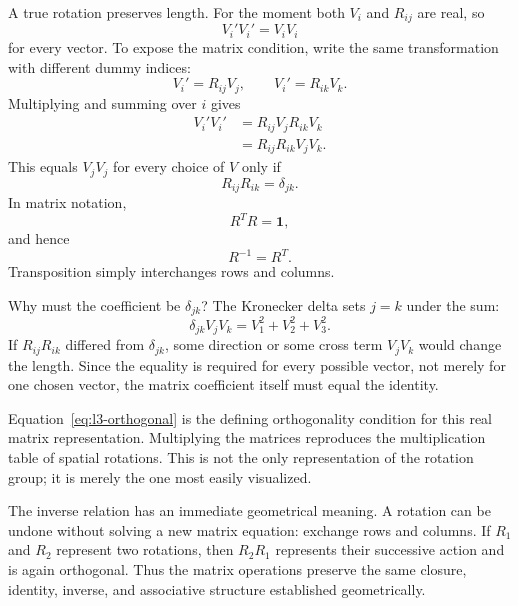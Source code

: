 A true rotation preserves length. For the moment both \(V_i\) and \(R_{ij}\)
are real, so
\begin{equation}
V_i'V_i'=V_iV_i
\end{equation}
for every vector. To expose the matrix condition, write the same
transformation with different dummy indices:
\begin{equation}
V_i'=R_{ij}V_j,\qquad V_i'=R_{ik}V_k.
\end{equation}
Multiplying and summing over \(i\) gives
\begin{align}
V_i'V_i'
 &=R_{ij}V_jR_{ik}V_k\\
 &=R_{ij}R_{ik}V_jV_k.
\end{align}
This equals \(V_jV_j\) for every choice of \(V\) only if
\begin{equation}
R_{ij}R_{ik}=\delta_{jk}.
\label{eq:l3-orthogonality-index}
\end{equation}
In matrix notation,
\begin{equation}
R^TR=\boldsymbol 1,
\label{eq:l3-orthogonal}
\end{equation}
and hence
\begin{equation}
R^{-1}=R^T.
\end{equation}
Transposition simply interchanges rows and columns.

Why must the coefficient be \(\delta_{jk}\)? The Kronecker delta sets \(j=k\)
under the sum:
\begin{equation}
\delta_{jk}V_jV_k=V_1^2+V_2^2+V_3^2.
\end{equation}
If \(R_{ij}R_{ik}\) differed from \(\delta_{jk}\), some direction or some
cross term \(V_jV_k\) would change the length. Since the equality is required
for every possible vector, not merely for one chosen vector, the matrix
coefficient itself must equal the identity.

Equation~\eqref{eq:l3-orthogonal} is the defining orthogonality condition for
this real matrix representation. Multiplying the matrices reproduces the
multiplication table of spatial rotations. This is not the only
representation of the rotation group; it is merely the one most easily
visualized.

The inverse relation has an immediate geometrical meaning. A rotation can be
undone without solving a new matrix equation: exchange rows and columns. If
\(R_1\) and \(R_2\) represent two rotations, then \(R_2R_1\) represents their
successive action and is again orthogonal. Thus the matrix operations preserve
the same closure, identity, inverse, and associative structure established
geometrically.

